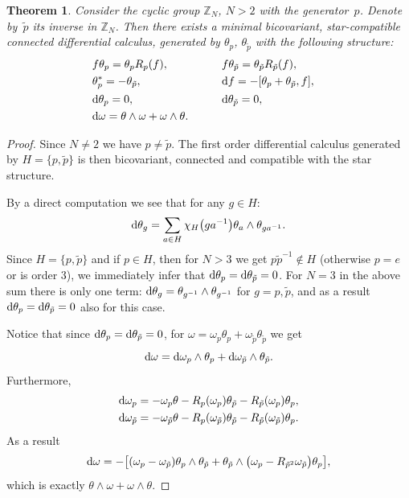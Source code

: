\documentclass[10pt,a4paper]{amsart}
\numberwithin{equation}{section}
\newtheorem{Theorem}{Theorem}[section]
\newcommand{\Z}{\mathbb{Z}}
\newcommand{\ip}{{\tilde{p}}}
\begin{document}
\begin{Theorem} \label{dcZN}
Consider the cyclic group $\Z_N$, $N>2$ with the generator~$p$. Denote by~$\tilde{p}$ its inverse in $\Z_N$.
Then there exists a minimal bicovariant, star-compatible connected differential calculus, generated by
$\theta_p$, $\theta_\ip$ with the following structure:
\begin{alignat*}{3}
& f \theta_p = \theta_p R_p(f), \qquad && f \theta_\ip = \theta_\ip R_\ip(f), &\nonumber\\
& \theta_p^* = - \theta_\ip, \qquad && {\rm d} f = - [ \theta_p + \theta_\ip, f ], &\nonumber\\
& {\rm d} \theta_p = 0, \qquad && {\rm d} \theta_\ip = 0,& \nonumber\\
& {\rm d} \omega = \theta \wedge \omega + \omega \wedge \theta.\qquad & && %
\end{alignat*}
\end{Theorem}
\begin{proof}Since $N\neq 2$ we have $p\neq \ip$. The first order differential calculus generated by $H=\{p,\ip\}$ is then bicovariant,
connected and compatible with the star structure.

By a direct computation we see that for any $g\in H$:
\[ {\rm d}\theta_g=\sum\limits_{a\in H}\chi_H\big(ga^{-1}\big)\theta_a\wedge \theta_{ga^{-1}}.\]
Since $H=\{p,\ip\}$ and if $p\in H$, then for $N>3$ we get $p\ip^{-1}\not\in H$ (otherwise $p=e$ or is order $3$), we immediately infer that ${\rm d}\theta_p={\rm d}\theta_{\ip}=0$. For $N=3$ in the above sum there is only one term: ${\rm d}\theta_g=\theta_{g^{-1}}\wedge \theta_{g^{-1}}$ for $g=p,\ip$, and as a result ${\rm d}\theta_p={\rm d}\theta_\ip=0$ also for this case.

Notice that since ${\rm d}\theta_p={\rm d}\theta_{\ip}=0$, for $\omega=\omega_p\theta_p+\omega_{\ip}\theta_{\ip}$ we get
\[ {\rm d}\omega={\rm d}\omega_p\wedge\theta_p+{\rm d}\omega_{\ip}\wedge\theta_{\ip}.\]
Furthermore,
\begin{gather*}
 {\rm d}\omega_p=-\omega_p\theta-R_{p}(\omega_p)\theta_{\ip}-R_{\ip}(\omega_p)\theta_p,\\
 {\rm d}\omega_\ip=-\omega_\ip\theta-R_{p}(\omega_\ip)\theta_{\ip}-R_{\ip}(\omega_\ip)\theta_p.
\end{gather*}
As a result
\[ {\rm d}\omega =-\big[(\omega_p-\omega_{\ip})\theta_p\wedge\theta_\ip+\theta_\ip\wedge\big(\omega_p-R_{\ip^2}\omega_\ip\big)\theta_p\big],\]
which is exactly $ \theta \wedge \omega + \omega \wedge \theta$.
\end{proof}
\end{document}
